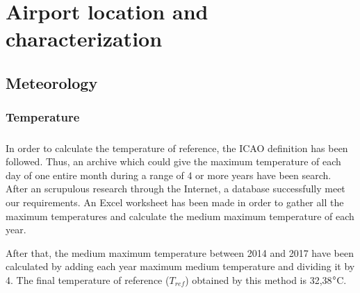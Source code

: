 \chapter{Airport location and characterization}

	\section{Meteorology}
		\subsection{Temperature}
		\paragraph{}In order to calculate the temperature of reference, the ICAO definition has been followed. Thus, an archive which could give the maximum temperature of each day of one entire month during a range of 4 or more years have been search. After an scrupulous research through the Internet, a database successfully meet our requirements. An Excel worksheet has been made in order to gather all the maximum temperatures and calculate the medium maximum temperature of each year. 
		
		After that, the medium maximum temperature between 2014 and 2017 have been calculated by adding each year maximum medium temperature and dividing it by 4. The final temperature of reference (\(T_{ref}\)) obtained by this method is 32,38\(\degree\)C. 